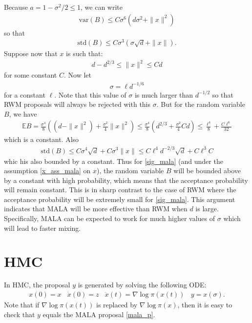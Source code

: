 \documentclass{scrartcl}
\newcommand{\E}{{\mathbb E}}
\begin{document}
Because $a = 1 - \sigma^2/2 \leq 1$, we can write
\begin{align*}
  \text{var}(B) \leq C \sigma^6 \left(d \sigma^2 + \|x\|^2 \right)
\end{align*}
so that
\begin{align*}
  \text{std}(B) \leq C \sigma^3 (\sigma \sqrt{d} + \|x\|). 
\end{align*}
Suppose now that $x$ is such that:
\begin{align}\label{x_ass_mala}
  d - d^{2/3} \leq \|x\|^2 \leq C d
\end{align}
for some constant $C$. Now let
\begin{align}
  \label{sig_mala}
  \sigma = \ell d^{-1/6}
\end{align}
for a constant $\ell$. Note that this  value of $\sigma$ is much
larger than $d^{-1/2}$ so that RWM 
proposals will always be rejected with this $\sigma$. But for the
random variable $B$, we have
\begin{align*}
  \E B = \frac{\sigma^4}{8} \left((d -
  \|x\|^2) + \frac{\sigma^2}{4} \|x\|^2 \right) \leq
  \frac{\sigma^4}{8} \left(d^{2/3} + \frac{\sigma^2}{4} C d \right)
  \leq \frac{\ell^4}{8} + \frac{C \ell^6}{32}
\end{align*}
which is a constant. Also
\begin{align*}
  \text{std}(B) \leq C \sigma^4 \sqrt{d} + C \sigma^3 \|x\| \leq C
  \ell^4 d^{-2/3} \sqrt{d} + C \ell^3 C 
\end{align*}
whic his also bounded by a constant. Thus for \eqref{sig_mala} (and
under the assumption \eqref{x_ass_mala} on $x$), the random variable
$B$ will be bounded above by a constant with high probability, which
means that the acceptance probability will remain constant. This is in
sharp contrast to the case of RWM where the acceptance probability
will be extremely small for \eqref{sig_mala}. This argument indicates
that MALA will be more effective than RWM when $d$ is
large. Specifically, MALA can be expected to work for much higher
values of $\sigma$ which will lead to faster mixing.

\section{HMC}

In HMC, the proposal $y$ is generated by solving the following ODE:
\begin{align}\label{hmc_ode}
  x(0) = x ~~~~ \dot{x}(0) = z ~~~~ \ddot{x}(t) = \nabla \log
  \pi(x(t)) ~~~~ y = x(\sigma). 
\end{align}
Note that if $\nabla \log \pi(x(t))$ is replaced by $\nabla \log
\pi(x)$, then it is easy to check that $y$ equals the MALA proposal
\eqref{mala_p}.
\end{document}
